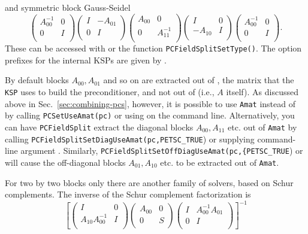 and symmetric block Gauss-Seidel
\[
\left( \begin{array}{cc}
A_{00}^{-1}   & 0 \\
0 & I \\
\end{array} \right)
\left( \begin{array}{cc}
I   & -A_{01} \\
0 & I \\
\end{array} \right)
\left( \begin{array}{cc}
A_{00}   & 0 \\
0 & A_{11}^{-1} \\
\end{array} \right)
\left( \begin{array}{cc}
I   & 0 \\
-A_{10} & I \\
\end{array} \right)
\left( \begin{array}{cc}
A_{00}^{-1}   & 0 \\
0 & I \\
\end{array} \right).
\]
These can be accessed with \break{}  or the function \lstinline{PCFieldSplitSetType()}. The option prefixes for the internal KSPs are given by .

By default blocks $A_{00}, A_{01}$ and so on are extracted out of , the matrix that the \lstinline{KSP} uses to build the preconditioner,
and not out of  (i.e., $A$ itself). As discussed above in Sec.~\ref{sec:combining-pcs}, however, it is possible to use \lstinline{Amat}
instead of  by calling \lstinline{PCSetUseAmat(pc)} or using  on the command line.  Alternatively, you can have \lstinline{PCFieldSplit}
extract the diagonal blocks $A_{00}, A_{11}$ etc. out of \lstinline{Amat} by calling \lstinline{PCFieldSplitSetDiagUseAmat(pc,PETSC_TRUE}) or supplying
command-line argument .  Similarly, \break\lstinline{PCFieldSplitSetOffDiagUseAmat(pc,{PETSC_TRUE}) or 
will cause the off-diagonal blocks $A_{01},A_{10}$ etc. to be extracted out of \lstinline{Amat}.

For two by two blocks only there are another family of solvers, based on Schur complements. The inverse of the Schur complement factorization is
\[
\left[
\left( \begin{array}{cc}
I   & 0 \\
A_{10}A_{00}^{-1} & I \\
\end{array} \right)
\left( \begin{array}{cc}
A_{00}  & 0 \\
0 & S \\
\end{array} \right)
\left( \begin{array}{cc}
I   & A_{00}^{-1} A_{01} \\
0 & I \\
\end{array} \right)
\right]^{-1}
\]


